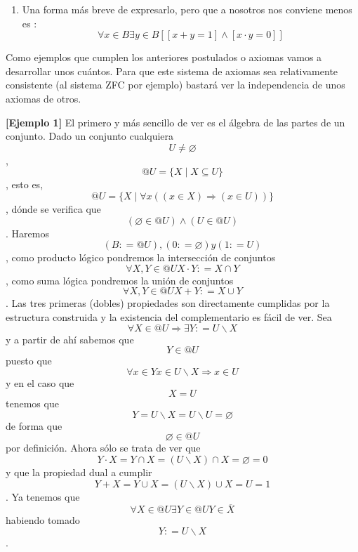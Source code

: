 \begin{enumerate}
\begin{enumerate}
\begin{enumerate}
\begin{enumerate}
        \begin{enumerate}
        \def\labelenumv{\arabic{enumv}.}
        \tightlist
        \item
          {[}sH4.1{]}\[\forall{x \in B}\forall{y \in \widehat{x}}\left( {{x + y} = 1} \right)\]
        \item
          {[}sH4.2{]}\[\forall{x \in B}\forall{y \in \widehat{x}}\left( {{x \cdot y} = 0} \right)\]
        \end{enumerate}
      \item
        Una forma más breve de expresarlo, pero que a nosotros nos
        conviene menos es :
        \[\forall{x \in B}{}{}{}\exists{y \in B}{}{}{}{}\left\lbrack {\left\lbrack {{x + y} = 1} \right\rbrack \land \left\lbrack {{x \cdot y} = 0} \right\rbrack} \right\rbrack\]
      \end{enumerate}
    \end{enumerate}
  \end{enumerate}

  Como ejemplos que cumplen los anteriores postulados o axiomas vamos a
  desarrollar unos cuántos. Para que este sistema de axiomas sea
  relativamente consistente (al sistema ZFC por ejemplo) bastará ver la
  independencia de unos axiomas de otros.

  \textbf{{[}Ejemplo 1{]}} El primero y más sencillo de ver es el
  álgebra de las partes de un conjunto. Dado un conjunto
  cualquiera\[U \neq \varnothing\],
  \[{@U} = {\{{X \mid {X \subseteq U}}\}}\], esto es,
  \[{@U} = {\{{X \mid {{\forall x}\left( {{({x \in X})}\Rightarrow{({x \in U})}} \right)}}\}}\],
  dónde se verifica
  que\[\left( {{\varnothing \in @}U} \right) \land \left( {{U \in @}U} \right)\].
  Ha\-remos\[\left( {B{: = @}U} \right),\left( {0{: = \varnothing}} \right)y\left( {1{: = U}} \right)\],
  como producto lógico pondremos la intersección de
  conjuntos\[\forall X,{Y \in @}U{X \cdot Y}{: = {X \cap Y}}\], como
  suma lógica pondremos la unión de
  conjuntos\[\forall X,{Y \in @}U{X + Y}{: = {X \cup Y}}\]. Las tres
  primeras (dobles) propiedades son di\-rectamente cumplidas por la
  estructura construida y la existencia del complementario es fá\-cil de
  ver. Sea
  \[\forall{X \in @}U\Rightarrow\exists Y{: = {U \smallsetminus X}}\]y a
  partir de ahí sabemos que\[{Y \in @}U\]puesto
  que\[\forall{x \in Y}{x \in {U \smallsetminus X}}\Rightarrow{x \in U}\]y
  en el caso que\[X = U\]tenemos que
  \[{{Y = {U \smallsetminus X}} = {U \smallsetminus U}} = \varnothing\]de
  forma que\[{\varnothing \in @}U\]por definición. Ahora sólo se trata
  de ver
  que\[{{{{Y \cdot X} = {Y \cap X}} = {{({U \smallsetminus X})} \cap X}} = \varnothing} = 0\]y
  que la propiedad dual a
  cumplir\[{{{{Y + X} = {Y \cup X}} = {{({U \smallsetminus X})} \cup X}} = U} = 1\].
  Ya tenemos
  que\[\forall{X \in @}U\exists{Y \in @}U{Y \in \overline{X}}\]ha\-biendo
  tomado\[Y{: = {U \smallsetminus X}}\].


\end{enumerate}
